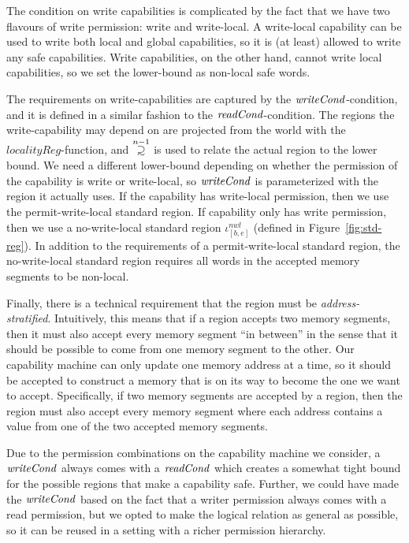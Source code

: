 \documentclass[format=acmsmall, review=true, screen=true]{acmart}
\renewcommand{\figurename}{Figure}
\newcommand\supsetsim{\mathrel{\ooalign{\raise.2ex\hbox{$\supset$}\cr
      \hidewidth\lower.8ex\hbox{\scalebox{0.9}{$\sim$}}\hidewidth\cr}}}
\newcommand{\nsupsim}[1][n]{\stackrel{\tiny{#1}}{\supsetsim}}
\newcommand{\var}[1]{\mathit{#1}}
\newcommand{\start}{\var{b}}
\newcommand{\addrend}{\var{e}}
\newcommand{\nwl}{\var{nwl}}
\newcommand{\plainfun}[2]{
  \ifthenelse{\equal{#2}{}}
  {\mathit{#1}}
  {\mathit{#1}(#2)}
}
\newcommand{\readCond}[1]{\plainfun{readCond}{#1}}
\newcommand{\writeCond}[1]{\plainfun{writeCond}{#1}}
\newcommand{\tpwl}{permit-write-local standard region}
\newcommand{\tnwl}{no-write-local standard region}
\begin{document}
The condition on write capabilities is complicated by the fact that we have two flavours of write permission: write and write-local.
A write-local capability can be used to write both local and global capabilities, so it is (at least) allowed to write any safe capabilities.
Write capabilities, on the other hand, cannot write local capabilities, so we set the lower-bound as non-local safe words.

The requirements on write-capabilities are captured by the $\writeCond{}$-condition, and it is defined in a similar fashion to the $\readCond{}$-condition.
The regions the write-capability may depend on are projected from the world with the $\var{localityReg}$-function, and $\nsupsim[n-1]$ is used to relate the actual region to the lower bound.
We need a different lower-bound depending on whether the permission of the capability is write or write-local, so $\writeCond{}$ is parameterized with the region it actually uses.
If the capability has write-local permission, then we use the \tpwl{}.
If capability only has write permission, then we use a \tnwl{} $\iota^\nwl_{[\start,\addrend]}$ (defined in \figurename~\ref{fig:std-reg}).
In addition to the requirements of a \tpwl, the \tnwl{} requires all words in the accepted memory segments to be non-local.

Finally, there is a technical requirement that the region must be \emph{address-stratified}.
Intuitively, this means that if a region accepts two memory segments, then it must also accept every memory segment ``in between'' in the sense that it should be possible to come from one memory segment to the other.
Our capability machine can only update one memory address at a time, so it should be accepted to construct a memory that is on its way to become the one we want to accept.
Specifically, if two memory segments are accepted by a region, then the region must also accept every memory segment where each address contains a value from one of the two accepted memory segments.

Due to the permission combinations on the capability machine we consider, a $\writeCond{}$ always comes with a $\readCond{}$ which creates a somewhat tight bound for the possible regions that make a capability safe.
Further, we could have made the $\writeCond{}$ based on the fact that a writer permission always comes with a read permission, but we opted to make the logical relation as general as possible, so it can be reused in a setting with a richer permission hierarchy.
\end{document}
